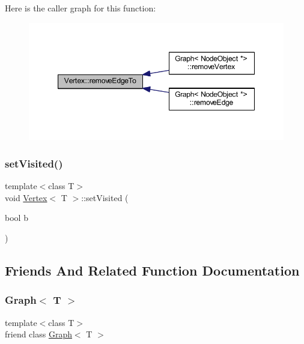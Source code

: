 Here is the caller graph for this function\+:
\nopagebreak
\begin{figure}[H]
\begin{center}
\leavevmode
\includegraphics[width=347pt]{class_vertex_ab2b5b43fb1709a901b78718436763a84_icgraph}
\end{center}
\end{figure}
\mbox{\label{class_vertex_ad68ed9cbef1d71c109081dbf81843dac}} 
\subsubsection{\texorpdfstring{set\+Visited()}{setVisited()}}
{\footnotesize\ttfamily template$<$class T$>$ \\
void \hyperlink{class_vertex}{Vertex}$<$ T $>$\+::set\+Visited (\begin{DoxyParamCaption}\item[{bool}]{b }\end{DoxyParamCaption})\hspace{0.3cm}{\ttfamily [inline]}}



\subsection{Friends And Related Function Documentation}
\mbox{\label{class_vertex_aefa9b76cd57411c5354e5620dc2d84dd}} 
\subsubsection{\texorpdfstring{Graph$<$ T $>$}{Graph< T >}}
{\footnotesize\ttfamily template$<$class T$>$ \\
friend class \hyperlink{class_graph}{Graph}$<$ T $>$\hspace{0.3cm}{\ttfamily [friend]}}



